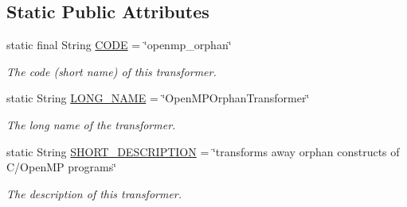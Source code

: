 \subsection*{Static Public Attributes}
\begin{DoxyCompactItemize}
\item 
\hypertarget{classedu_1_1udel_1_1cis_1_1vsl_1_1civl_1_1transform_1_1IF_1_1OpenMPOrphanTransformer_ab91ef7b4e4a186ebd511afc51d564204}{}static final String \hyperlink{classedu_1_1udel_1_1cis_1_1vsl_1_1civl_1_1transform_1_1IF_1_1OpenMPOrphanTransformer_ab91ef7b4e4a186ebd511afc51d564204}{C\+O\+D\+E} = \char`\"{}openmp\+\_\+orphan\char`\"{}\label{classedu_1_1udel_1_1cis_1_1vsl_1_1civl_1_1transform_1_1IF_1_1OpenMPOrphanTransformer_ab91ef7b4e4a186ebd511afc51d564204}

\begin{DoxyCompactList}\small\item\em The code (short name) of this transformer. \end{DoxyCompactList}\item 
\hypertarget{classedu_1_1udel_1_1cis_1_1vsl_1_1civl_1_1transform_1_1IF_1_1OpenMPOrphanTransformer_a4d758597be8d41d091f9c8255e328cc9}{}static String \hyperlink{classedu_1_1udel_1_1cis_1_1vsl_1_1civl_1_1transform_1_1IF_1_1OpenMPOrphanTransformer_a4d758597be8d41d091f9c8255e328cc9}{L\+O\+N\+G\+\_\+\+N\+A\+M\+E} = \char`\"{}Open\+M\+P\+Orphan\+Transformer\char`\"{}\label{classedu_1_1udel_1_1cis_1_1vsl_1_1civl_1_1transform_1_1IF_1_1OpenMPOrphanTransformer_a4d758597be8d41d091f9c8255e328cc9}

\begin{DoxyCompactList}\small\item\em The long name of the transformer. \end{DoxyCompactList}\item 
\hypertarget{classedu_1_1udel_1_1cis_1_1vsl_1_1civl_1_1transform_1_1IF_1_1OpenMPOrphanTransformer_a1f0b1153cd154c09f98472f4aeb279dc}{}static String \hyperlink{classedu_1_1udel_1_1cis_1_1vsl_1_1civl_1_1transform_1_1IF_1_1OpenMPOrphanTransformer_a1f0b1153cd154c09f98472f4aeb279dc}{S\+H\+O\+R\+T\+\_\+\+D\+E\+S\+C\+R\+I\+P\+T\+I\+O\+N} = \char`\"{}transforms away orphan constructs of C/Open\+M\+P programs\char`\"{}\label{classedu_1_1udel_1_1cis_1_1vsl_1_1civl_1_1transform_1_1IF_1_1OpenMPOrphanTransformer_a1f0b1153cd154c09f98472f4aeb279dc}

\begin{DoxyCompactList}\small\item\em The description of this transformer. \end{DoxyCompactList}\end{DoxyCompactItemize}


